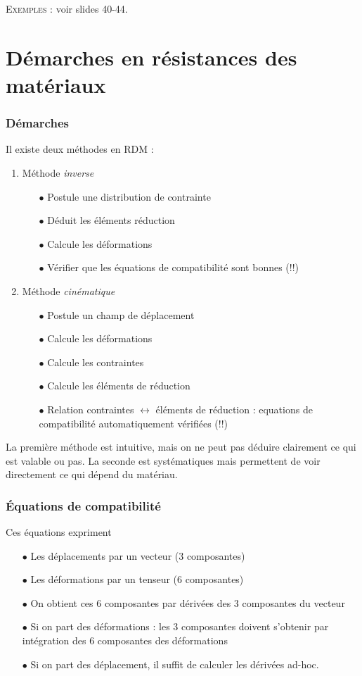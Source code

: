 	\textsc{Exemples} : voir slides 40-44.
\newpage
\section{Démarches en résistances des matériaux}
	\subsubsection{Démarches}
Il existe deux méthodes en RDM :
\begin{enumerate}
\item Méthode \textit{inverse}
\begin{itemize}
\item[$\bullet$] Postule une distribution de contrainte
\item[$\bullet$] Déduit les éléments réduction
\item[$\bullet$] Calcule les déformations
\item[$\bullet$] Vérifier que les équations de compatibilité sont bonnes (!!)
\end{itemize}

\item Méthode \textit{cinématique}
\begin{itemize}
\item[$\bullet$] Postule un champ de déplacement
\item[$\bullet$] Calcule les déformations
\item[$\bullet$] Calcule les contraintes
\item[$\bullet$] Calcule les éléments de réduction
\item[$\bullet$] Relation contraintes $\leftrightarrow$ éléments de 
réduction : equations de compatibilité automatiquement vérifiées (!!)
\end{itemize}
\end{enumerate}
	
La première méthode est intuitive, mais on ne peut pas déduire clairement 
ce qui est valable ou pas. La seconde est systématiques mais permettent de 
voir directement ce qui dépend du matériau.
	
	\subsubsection{Équations de compatibilité}
	Ces équations expriment
	\begin{itemize}
	\item[$\bullet$] Les déplacements par un vecteur (3 composantes)
	\item[$\bullet$] Les déformations par un tenseur (6 composantes)
	\item[$\bullet$] On obtient ces 6 composantes par dérivées des 
	3 composantes du vecteur
 	\item[$\bullet$] Si on part des déformations : les 3 composantes 
 	doivent s'obtenir par intégration des 6 composantes des déformations
	\item[$\bullet$] Si on part des déplacement, il suffit de calculer 
	les dérivées ad-hoc.
	\end{itemize}
	
